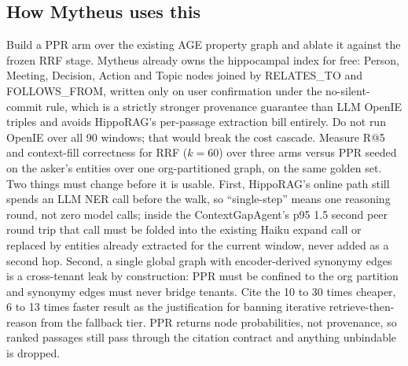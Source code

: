 \subsection{How Mytheus uses this}
\begin{takeaway}
Build a PPR arm over the existing AGE property graph and ablate it against the frozen RRF stage. Mytheus already owns the hippocampal index for free: Person, Meeting, Decision, Action and Topic nodes joined by RELATES\_TO and FOLLOWS\_FROM, written only on user confirmation under the no-silent-commit rule, which is a strictly stronger provenance guarantee than LLM OpenIE triples and avoids HippoRAG's per-passage extraction bill entirely. Do not run OpenIE over all 90 windows; that would break the cost cascade. Measure R@5 and context-fill correctness for RRF ($k = 60$) over three arms versus PPR seeded on the asker's entities over one org-partitioned graph, on the same golden set. Two things must change before it is usable. First, HippoRAG's online path still spends an LLM NER call before the walk, so ``single-step'' means one reasoning round, not zero model calls; inside the ContextGapAgent's p95 1.5 second peer round trip that call must be folded into the existing Haiku expand call or replaced by entities already extracted for the current window, never added as a second hop. Second, a single global graph with encoder-derived synonymy edges is a cross-tenant leak by construction: PPR must be confined to the org partition and synonymy edges must never bridge tenants. Cite the 10 to 30 times cheaper, 6 to 13 times faster result as the justification for banning iterative retrieve-then-reason from the fallback tier. PPR returns node probabilities, not provenance, so ranked passages still pass through the citation contract and anything unbindable is dropped.
\end{takeaway}

